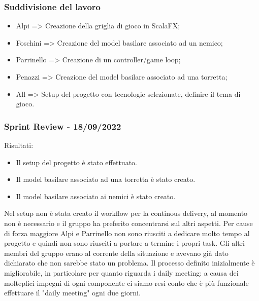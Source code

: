 \subsubsection*{Suddivisione del lavoro}
\begin{itemize}
  \item Alpi => Creazione della griglia di gioco in ScalaFX;
  \item Foschini => Creazione del model basilare associato ad un nemico;
  \item Parrinello => Creazione di un controller/game loop;
  \item Penazzi => Creazione del model basilare associato ad una torretta;
  \item All => Setup del progetto con tecnologie selezionate, definire il tema di gioco.
\end{itemize}

\subsubsection{Sprint Review - 18/09/2022}
Risultati:
\begin{itemize}
  \item Il setup del progetto è stato effettuato.
  \item Il model basilare associato ad una torretta è stato creato.
  \item Il model basilare associato ai nemici è stato creato.
\end{itemize}

Nel setup non è stata creato il workflow per la continous delivery, al momento non è necessario e il gruppo ha preferito concentrarsi sul altri aspetti.
Per cause di forza maggiore Alpi e Parrinello non sono riusciti a dedicare molto tempo al progetto e quindi non sono riusciti a portare a termine i propri task. Gli altri membri del gruppo erano al corrente della situazione e avevano già dato dichiarato che non sarebbe stato un problema.
Il processo definito inizialmente è migliorabile, in particolare per quanto riguarda i daily meeting: a causa dei molteplici impegni di ogni componente ci siamo resi conto che è più funzionale effettuare il "daily meeting" ogni due giorni.

\newpage
